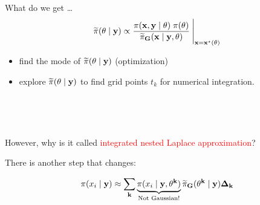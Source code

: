 \documentclass[
  ignorenonframetext,
]{beamer}
\begin{document}
\begin{frame}{What do we get \ldots{}}
\protect\hypertarget{what-do-we-get}{}
\[
\widetilde{\pi}(\bf{\theta} \mid \bf{y}) \propto  \frac{
           \pi(\bf{x}, \bf{y}\mid \bf{\theta})
        \; \pi(\bf{\theta})}{\widetilde{\pi}_G(\bf{x} \mid \bf{y},
            \bf{\theta})} \: \Bigg|_{\bf{x} = \bf{x}^\star(\bf{\theta})}
\]

\begin{itemize}
\item
  find the mode of \(\widetilde{\pi}(\bf{\theta}\mid \bf{y})\)
  (optimization)
\item
  explore \(\widetilde{\pi}(\bf{\theta}\mid \bf{y})\) to find grid
  points \(t_k\) for numerical integration.\\
  \strut \\
  \strut \\
\end{itemize}

\pause

However, why is it called \textcolor{red}{integrated nested Laplace
      approximation}?

\pause

There is another step that changes:

\[
\pi(x_{i} \mid \bf{y}) \approx \sum_k \underbrace{\pi(x_{i} \mid \bf{y}, \theta^k)}_{{\text{Not Gaussian!}}}{\widetilde{\pi}_G(\theta^k\mid\bf{y})} \Delta_k
\]
\end{frame}
\end{document}
